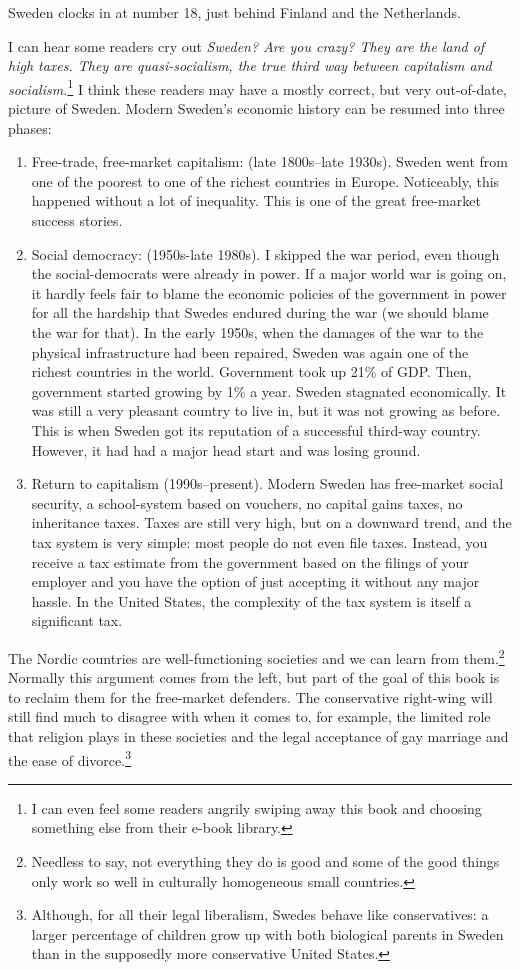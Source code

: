 Sweden clocks in at number 18, just behind Finland and the Netherlands.

I can hear some readers cry out \emph{Sweden? Are you crazy? They are the land
of high taxes. They are quasi-socialism, the true third way between capitalism
and socialism.}\footnote{I can even feel some readers angrily swiping away this
book and choosing something else from their e-book library.} I think these
readers may have a mostly correct, but very out-of-date, picture of Sweden.
Modern Sweden's economic history can be resumed into three phases:

\begin{enumerate}
\item Free-trade, free-market capitalism: (late 1800s--late 1930s). Sweden went
from one of the poorest to one of the richest countries in Europe. Noticeably,
this happened without a lot of inequality. This is one of the great free-market
success stories.
\item Social democracy: (1950s-late 1980s). I skipped the war period, even
though the social-democrats were already in power. If a major world war is
going on, it hardly feels fair to blame the economic policies of the government
in power for all the hardship that Swedes endured during the war (we should
blame the war for that). In the early 1950s, when the damages of the war to the
physical infrastructure had been repaired, Sweden was again one of the richest
countries in the world. Government took up 21\% of GDP. Then, government
started growing by 1\% a year. Sweden stagnated economically.  It was still a
very pleasant country to live in,  but it was not growing as before. This is
when Sweden got its reputation of a successful third-way country. However, it
had had a major head start and was losing ground.
\item Return to capitalism (1990s--present). Modern Sweden has free-market
social security, a school-system based on vouchers, no capital gains taxes, no
inheritance taxes. Taxes are still very high, but on a downward trend, and the
tax system is very simple: most people do not even file taxes. Instead, you
receive a tax estimate from the government based on the filings of your
employer and you have the option of just accepting it without any major hassle.
In the United States, the complexity of the tax system is itself a significant
tax.
\end{enumerate}

The Nordic countries are well-functioning societies and we can learn from
them.\footnote{Needless to say, not everything they do is good and some of the
good things only work so well in culturally homogeneous small countries.}
Normally this argument comes from the left, but part of the goal of this book
is to reclaim them for the free-market defenders. The conservative right-wing
will still find much to disagree with when it comes to, for example, the
limited role that religion plays in these societies and the legal acceptance of
gay marriage and the ease of divorce.\footnote{Although, for all their legal
liberalism, Swedes behave like conservatives: a larger percentage of children
grow up with both biological parents in Sweden than in the supposedly more
conservative United States.}

